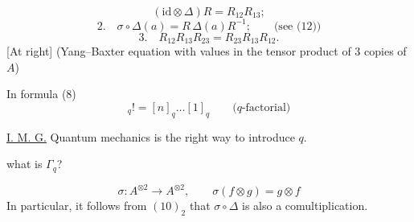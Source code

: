 \[
(\mathrm{id}\otimes\Delta)R=R_{12}R_{13};
\]
\[
2.\quad \sigma\circ\Delta(a)=R\,\Delta(a)R^{-1};\qquad
 \text{(see (12))}
\]
\[
3.\quad R_{12}R_{13}R_{23}=R_{23}R_{13}R_{12}.
\]
[At right] (Yang–Baxter equation with values in the tensor product of 3 copies of \(A\))

In formula (8)
\begin{equation*}
[n]_q!=[n]_q\ldots[1]_q\qquad\text{(\(q\)-factorial)}
\tag{11}
\end{equation*}

\underline{I. M. G.} Quantum mechanics is the right way to introduce \(q\).

 what is \(\Gamma_q\)?

\begin{equation*}
\sigma\colon A^{\otimes2}\longrightarrow A^{\otimes2},\qquad
\sigma(f\otimes g)=g\otimes f
\tag{12}
\end{equation*}
In particular, it follows from \((10)_2\) that \(\sigma\circ\Delta\) is also a comultiplication.


